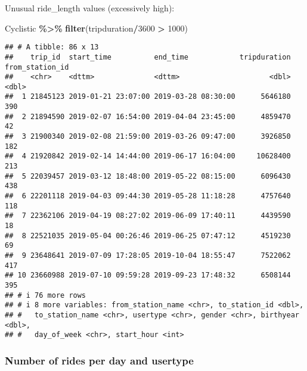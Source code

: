 \documentclass[
]{article}
\newenvironment{Shaded}{\begin{snugshade}}{\end{snugshade}}
\newcommand{\DecValTok}[1]{\textcolor[rgb]{0.00,0.00,0.81}{#1}}
\newcommand{\FunctionTok}[1]{\textcolor[rgb]{0.13,0.29,0.53}{\textbf{#1}}}
\newcommand{\NormalTok}[1]{#1}
\newcommand{\SpecialCharTok}[1]{\textcolor[rgb]{0.81,0.36,0.00}{\textbf{#1}}}
\begin{document}
Unusual ride\_length values (excessively high):

\begin{Shaded}
\begin{Highlighting}[]
\NormalTok{Cyclistic }\SpecialCharTok{\%\textgreater{}\%}
  \FunctionTok{filter}\NormalTok{(tripduration}\SpecialCharTok{/}\DecValTok{3600} \SpecialCharTok{\textgreater{}} \DecValTok{1000}\NormalTok{)}
\end{Highlighting}
\end{Shaded}

\begin{verbatim}
## # A tibble: 86 x 13
##    trip_id  start_time          end_time            tripduration from_station_id
##    <chr>    <dttm>              <dttm>                     <dbl>           <dbl>
##  1 21845123 2019-01-21 23:07:00 2019-03-28 08:30:00      5646180             390
##  2 21894590 2019-02-07 16:54:00 2019-04-04 23:45:00      4859470              42
##  3 21900340 2019-02-08 21:59:00 2019-03-26 09:47:00      3926850             182
##  4 21920842 2019-02-14 14:44:00 2019-06-17 16:04:00     10628400             213
##  5 22039457 2019-03-12 18:48:00 2019-05-22 08:15:00      6096430             438
##  6 22201118 2019-04-03 09:44:30 2019-05-28 11:18:28      4757640             118
##  7 22362106 2019-04-19 08:27:02 2019-06-09 17:40:11      4439590              18
##  8 22521035 2019-05-04 00:26:46 2019-06-25 07:47:12      4519230              69
##  9 23648641 2019-07-09 17:28:05 2019-10-04 18:55:47      7522062             417
## 10 23660988 2019-07-10 09:59:28 2019-09-23 17:48:32      6508144             395
## # i 76 more rows
## # i 8 more variables: from_station_name <chr>, to_station_id <dbl>,
## #   to_station_name <chr>, usertype <chr>, gender <chr>, birthyear <dbl>,
## #   day_of_week <chr>, start_hour <int>
\end{verbatim}

\hypertarget{number-of-rides-per-day-and-usertype}{%
\subsubsection{Number of rides per day and
usertype}\label{number-of-rides-per-day-and-usertype}}
\end{document}
